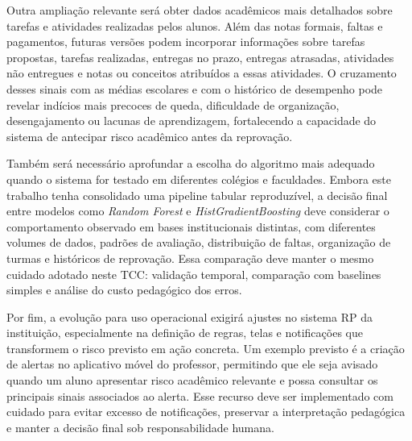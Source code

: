 Outra amplia\c{c}\~ao relevante ser\'a obter dados acad\^emicos mais detalhados sobre tarefas e atividades realizadas pelos alunos. Al\'em das notas formais, faltas e pagamentos, futuras vers\~oes podem incorporar informa\c{c}\~oes sobre tarefas propostas, tarefas realizadas, entregas no prazo, entregas atrasadas, atividades n\~ao entregues e notas ou conceitos atribu\'idos a essas atividades. O cruzamento desses sinais com as m\'edias escolares e com o hist\'orico de desempenho pode revelar ind\'icios mais precoces de queda, dificuldade de organiza\c{c}\~ao, desengajamento ou lacunas de aprendizagem, fortalecendo a capacidade do sistema de antecipar risco acad\^emico antes da reprova\c{c}\~ao.

Tamb\'em ser\'a necess\'ario aprofundar a escolha do algoritmo mais adequado quando o sistema for testado em diferentes col\'egios e faculdades. Embora este trabalho tenha consolidado uma pipeline tabular reproduz\'ivel, a decis\~ao final entre modelos como \textit{Random Forest} e \textit{HistGradientBoosting} deve considerar o comportamento observado em bases institucionais distintas, com diferentes volumes de dados, padr\~oes de avalia\c{c}\~ao, distribui\c{c}\~ao de faltas, organiza\c{c}\~ao de turmas e hist\'oricos de reprova\c{c}\~ao. Essa compara\c{c}\~ao deve manter o mesmo cuidado adotado neste TCC: valida\c{c}\~ao temporal, compara\c{c}\~ao com baselines simples e an\'alise do custo pedag\'ogico dos erros.

Por fim, a evolu\c{c}\~ao para uso operacional exigir\'a ajustes no sistema RP da institui\c{c}\~ao, especialmente na defini\c{c}\~ao de regras, telas e notifica\c{c}\~oes que transformem o risco previsto em a\c{c}\~ao concreta. Um exemplo previsto \'e a cria\c{c}\~ao de alertas no aplicativo m\'ovel do professor, permitindo que ele seja avisado quando um aluno apresentar risco acad\^emico relevante e possa consultar os principais sinais associados ao alerta. Esse recurso deve ser implementado com cuidado para evitar excesso de notifica\c{c}\~oes, preservar a interpreta\c{c}\~ao pedag\'ogica e manter a decis\~ao final sob responsabilidade humana.

